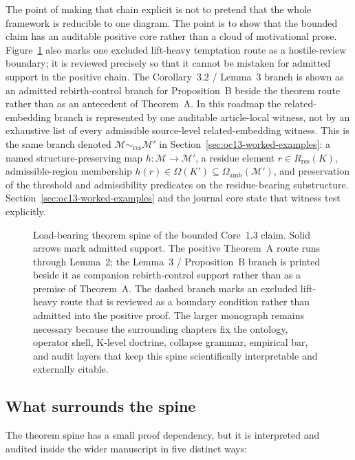 The point of making that chain explicit is not to pretend that the whole
framework is reducible to one diagram. The point is to show that the bounded
claim has an auditable positive core rather than a cloud of motivational prose.
Figure~\ref{fig:oc13-theorem-spine} also marks one excluded lift-heavy
temptation route as a hostile-review boundary; it is reviewed precisely so that
it cannot be mistaken for admitted support in the positive chain. The
Corollary~3.2 / Lemma~3 branch is shown as an admitted rebirth-control branch
for Proposition~B beside the theorem route rather than as an antecedent of
Theorem~A. In this roadmap the related-embedding branch is represented by one
auditable article-local witness, not by an exhaustive list of every admissible
source-level related-embedding witness. This is the same branch denoted
\(\mathcal{M}\sim_{\mathrm{res}}\mathcal{M}'\) in
Section~\ref{sec:oc13-worked-examples}: a named structure-preserving map
\(h:\mathcal{M}\to\mathcal{M}'\), a residue element
\(r\in R_{\mathrm{res}}(K)\),
admissible-region membership
\(h(r)\in\Omega(K')\subseteq\Omega_{\mathrm{amb}}(\mathcal{M}')\),
and preservation of the threshold and admissibility predicates on the
residue-bearing substructure. Section~\ref{sec:oc13-worked-examples} and
the journal core state that witness test explicitly.

\begin{figure}[htbp]
\centering

\caption{Load-bearing theorem spine of the bounded Core~1.3 claim. Solid arrows
mark admitted support. The positive Theorem~A route runs through Lemma~2; the
Lemma~3 / Proposition~B branch is printed beside it as companion
rebirth-control support rather than as a premise of Theorem~A. The dashed branch
marks an excluded lift-heavy route that is reviewed as
a boundary condition rather than admitted into the positive proof. The larger
monograph remains necessary because the surrounding chapters fix the ontology,
operator shell, K-level doctrine, collapse grammar, empirical bar, and audit
layers that keep this spine scientifically interpretable and externally
citable.}
\label{fig:oc13-theorem-spine}
\end{figure}

\subsection{What surrounds the spine}

The theorem spine has a small proof dependency, but it is interpreted and
audited inside the wider manuscript in five distinct ways:

